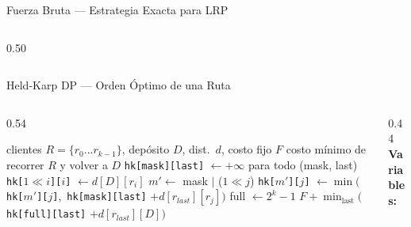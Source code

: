\documentclass[aspectratio=169,10pt]{beamer}
\begin{document}
\begin{frame}{Fuerza Bruta --- Estrategia Exacta para LRP}
\begin{columns}[T,onlytextwidth]
\begin{column}{0.50\textwidth}
\begin{center}
{}
      \end{center}
    \end{column}
  \end{columns}
\end{frame}

\begin{frame}{Held-Karp DP --- Orden Óptimo de una Ruta}
  \begin{columns}[T,onlytextwidth]
    \begin{column}{0.54\textwidth}
      \begin{algorithm}[H]
        \caption{\small Held-Karp: costo mínimo de ruta}
        \begin{algorithmic}[1]\tiny
          \Require clientes $R{=}\{r_0\ldots r_{k-1}\}$, depósito $D$, dist.\ $d$, costo fijo $F$
          \Ensure  costo mínimo de recorrer $R$ y volver a $D$
          \State \texttt{hk[mask][last]} $\gets +\infty$ para todo (mask, last)
            \State \texttt{hk[$1{\ll}i$][$i$]} $\gets d[D][r_i]$
          \EndFor
                \State $m' \gets$ mask $|$ ($1{\ll}j$)
                \State \texttt{hk[$m'$][$j$]} $\gets \min\bigl($\texttt{hk[$m'$][$j$]},\
                        \texttt{hk[mask][last]} $+ d[r_{last}][r_j]\bigr)$
              \EndFor
            \EndFor
          \EndFor
          \State full $\gets 2^k{-}1$
          \State \Return $F + \displaystyle\min_{\text{last}}\bigl($\texttt{hk[full][last]} $+ d[r_{last}][D]\bigr)$
        \end{algorithmic}
      \end{algorithm}
    \end{column}
    \begin{column}{0.44\textwidth}
      \textbf{Variables:}

\end{column}
\end{columns}
\end{frame}
\end{document}
